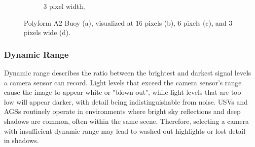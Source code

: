 \documentclass{erauthesis}
\begin{document}
\begin{figure}[htbp]
\begin{subfigure}[t]{0.245\textwidth}
    \caption{
    3 pixel width,\\  
    }
    \label{fig:A2_3px}
\end{subfigure}
\caption{Polyform A2 Buoy (a), visualized at 16 pixels (b), 6 pixels (c), and 3 pixels wide (d).}
\label{fig:A2_multi_res}
\end{figure}







\subsubsection{Dynamic Range}
Dynamic range describes the ratio between the brightest and darkest signal levels a camera sensor can record.
Light levels that exceed the camera sensor's range cause the image to appear white or "blown-out", while light levels that are too low will appear darker, with detail being indistinguishable from noise.
\acp{USV} and \acp{AGS} routinely operate in environments where bright sky reflections and deep shadows are common, often within the same scene.
Therefore, selecting a camera with insufficient dynamic range may lead to washed-out highlights or lost detail in shadows.
\end{document}
